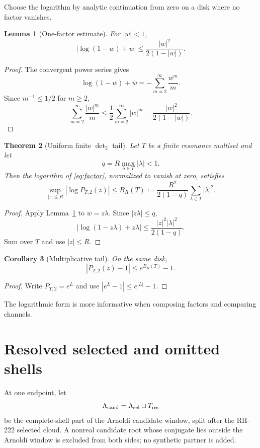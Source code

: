 \documentclass[11pt]{article}
\newtheorem{theorem}{Theorem}[section]
\newtheorem{lemma}[theorem]{Lemma}
\newtheorem{corollary}[theorem]{Corollary}
\theoremstyle{remark}\newtheorem{remark}[theorem]{Remark}
\begin{document}
Choose the logarithm by analytic continuation from zero on a disk where no
factor vanishes.

\begin{lemma}[One-factor estimate]\label{lem:one}
For $|w|<1$,
\begin{equation}\label{eq:one}
 |\log(1-w)+w|
 \le\frac{|w|^2}{2(1-|w|)}.
\end{equation}
\end{lemma}
\begin{proof}
The convergent power series gives
\[
 \log(1-w)+w=-\sum_{m=2}^{\infty}\frac{w^m}{m}.
\]
Since $m^{-1}\le1/2$ for $m\ge2$,
\[
 \sum_{m=2}^{\infty}\frac{|w|^m}{m}
 \le\frac12\sum_{m=2}^{\infty}|w|^m
 =\frac{|w|^2}{2(1-|w|)}.
\]
\end{proof}

\begin{theorem}[Uniform finite $\det_2$ tail]\label{thm:tail}
Let $T$ be a finite resonance multiset and let
\[
 q=R\max_{\lambda\in T}|\lambda|<1.
\]
Then the logarithm of \eqref{eq:factor}, normalized to vanish at zero,
satisfies
\begin{equation}\label{eq:bound}
 \sup_{|z|\le R}|\log P_{T,2}(z)|
 \le B_R(T):=
 \frac{R^2}{2(1-q)}\sum_{\lambda\in T}|\lambda|^2.
\end{equation}
\end{theorem}
\begin{proof}
Apply Lemma~\ref{lem:one} to $w=z\lambda$. Since
$|z\lambda|\le q$,
\[
 |\log(1-z\lambda)+z\lambda|
 \le\frac{|z|^2|\lambda|^2}{2(1-q)}.
\]
Sum over $T$ and use $|z|\le R$.
\end{proof}

\begin{corollary}[Multiplicative tail]\label{cor:mult}
On the same disk,
\[
 |P_{T,2}(z)-1|\le e^{B_R(T)}-1.
\]
\end{corollary}
\begin{proof}
Write $P_{T,2}=e^L$ and use
$|e^L-1|\le e^{|L|}-1$.
\end{proof}

The logarithmic form is more informative when composing factors and comparing
channels.

\section{Resolved selected and omitted shells}

At one endpoint, let
\[
 \Lambda_{\rm cand}
 =\Lambda_{\rm sel}\sqcup T_{\rm res}
\]
be the complete-shell part of the Arnoldi candidate window, split after the
RH-222 selected cloud. A nonreal candidate root whose conjugate lies outside
the Arnoldi window is excluded from both sides; no synthetic partner is added.
\end{document}
